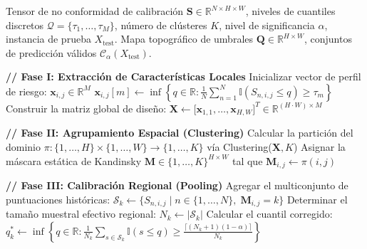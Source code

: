 \begin{algorithm}[H]
    \caption{Algoritmo de Kandinsky Conformal Prediction}
    \label{alg:kandinsky}
    \begin{algorithmic}[1]
        \REQUIRE Tensor de no conformidad de calibración $\mathbf{S} \in \mathbb{R}^{N \times H \times W}$, niveles de cuantiles discretos $\mathcal{Q} = \{\tau_1, \dots, \tau_M\}$, número de clústeres $K$, nivel de significancia $\alpha$, instancia de prueba $X_{\text{test}}$.
        \ENSURE Mapa topográfico de umbrales $\mathbf{Q} \in \mathbb{R}^{H \times W}$, conjuntos de predicción válidos $\mathcal{C}_{\alpha}(X_{\text{test}})$.

        \vspace{0.1cm}
        \STATE \textbf{// Fase I: Extracción de Características Locales}
            \STATE Inicializar vector de perfil de riesgo: $\mathbf{x}_{i,j} \in \mathbb{R}^M$
                \STATE $\mathbf{x}_{i,j}[m] \leftarrow \inf \left\{ q \in \mathbb{R} : \frac{1}{N} \sum_{n=1}^N \mathbb{I}(S_{n,i,j} \leq q) \geq \tau_m \right\}$
            \ENDFOR
        \ENDFOR
        \STATE Construir la matriz global de diseño: $\mathbf{X} \leftarrow \big[\mathbf{x}_{1,1}, \dots, \mathbf{x}_{H,W}\big]^T \in \mathbb{R}^{(H \cdot W) \times M}$

        \vspace{0.1cm}
        \STATE \textbf{// Fase II: Agrupamiento Espacial (Clustering)}
        \STATE Calcular la partición del dominio $\pi: \{1, \dots, H\} \times \{1, \dots, W\} \to \{1, \dots, K\}$ vía Clustering($\mathbf{X}, K$)
        \STATE Asignar la máscara estática de Kandinsky $\mathbf{M} \in \{1, \dots, K\}^{H \times W}$ tal que $\mathbf{M}_{i,j} \leftarrow \pi(i,j)$

        \vspace{0.1cm}
        \STATE \textbf{// Fase III: Calibración Regional (Pooling)}
            \STATE Agregar el multiconjunto de puntuaciones históricas: $\mathcal{S}_k \leftarrow \Big\{ S_{n,i,j} \;\Big|\; n \in \{1, \dots, N\}, \; \mathbf{M}_{i,j} = k \Big\}$
            \STATE Determinar el tamaño muestral efectivo regional: $N_k \leftarrow |\mathcal{S}_k| $
            \STATE Calcular el cuantil corregido: $q_k^* \leftarrow \inf \left\{ q \in \mathbb{R} : \frac{1}{N_k} \sum_{s \in \mathcal{S}_k} \mathbb{I}(s \leq q) \geq \frac{\lceil (N_k + 1)(1 - \alpha) \rceil}{N_k} \right\}$
        \ENDFOR


\end{algorithmic}
\end{algorithm}
